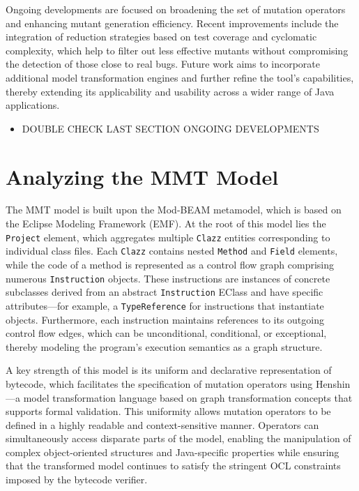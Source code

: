 \documentclass[12pt,a4paper]{article}
\begin{document}
Ongoing developments are focused on broadening the set of mutation operators
and enhancing mutant generation efficiency. Recent improvements include the
integration of reduction strategies based on test coverage and cyclomatic
complexity, which help to filter out less effective mutants without
compromising the detection of those close to real bugs. Future work aims to
incorporate additional model transformation engines and further refine the
tool's capabilities, thereby extending its applicability and usability across
a wider range of Java applications.

\begin{itemize}
	\item DOUBLE CHECK LAST SECTION ONGOING DEVELOPMENTS
\end{itemize}

\section{Analyzing the MMT Model}

The MMT model is built upon the Mod-BEAM metamodel, which is based on the
Eclipse Modeling Framework (EMF). At the root of this model lies the
\texttt{Project} element, which aggregates multiple \texttt{Clazz} entities
corresponding to individual class files. Each \texttt{Clazz} contains nested
\texttt{Method} and \texttt{Field} elements, while the code of a method is
represented as a control flow graph comprising numerous \texttt{Instruction}
objects. These instructions are instances of concrete subclasses derived from
an abstract \texttt{Instruction} EClass and have specific attributes—for
example, a \texttt{TypeReference} for instructions that instantiate objects.
Furthermore, each instruction maintains references to its outgoing control
flow edges, which can be unconditional, conditional, or exceptional, thereby
modeling the program's execution semantics as a graph structure.

A key strength of this model is its uniform and declarative representation of
bytecode, which facilitates the specification of mutation operators using
Henshin—a model transformation language based on graph transformation
concepts that supports formal validation. This uniformity allows mutation
operators to be defined in a highly readable and context-sensitive manner.
Operators can simultaneously access disparate parts of the model, enabling
the manipulation of complex object-oriented structures and Java-specific
properties while ensuring that the transformed model continues to satisfy the
stringent OCL constraints imposed by the bytecode verifier.
\end{document}
